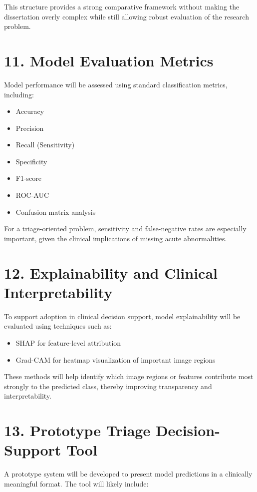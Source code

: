 \documentclass[12pt,a4paper]{report}
\begin{document}
This structure provides a strong comparative framework without making the dissertation overly complex while still allowing robust evaluation of the research problem.


\section{11. Model Evaluation Metrics}

Model performance will be assessed using standard classification metrics, including:

\begin{itemize}
\item Accuracy
\item Precision
\item Recall (Sensitivity)
\item Specificity
\item F1-score
\item ROC-AUC
\item Confusion matrix analysis
\end{itemize}

For a triage-oriented problem, sensitivity and false-negative rates are especially important, given the clinical implications of missing acute abnormalities.


\section{12. Explainability and Clinical Interpretability}

To support adoption in clinical decision support, model explainability will be evaluated using techniques such as:

\begin{itemize}
\item SHAP for feature-level attribution
\item Grad-CAM for heatmap visualization of important image regions
\end{itemize}

These methods will help identify which image regions or features contribute most strongly to the predicted class, thereby improving transparency and interpretability.


\section{13. Prototype Triage Decision-Support Tool}

A prototype system will be developed to present model predictions in a clinically meaningful format. The tool will likely include:
\end{document}
